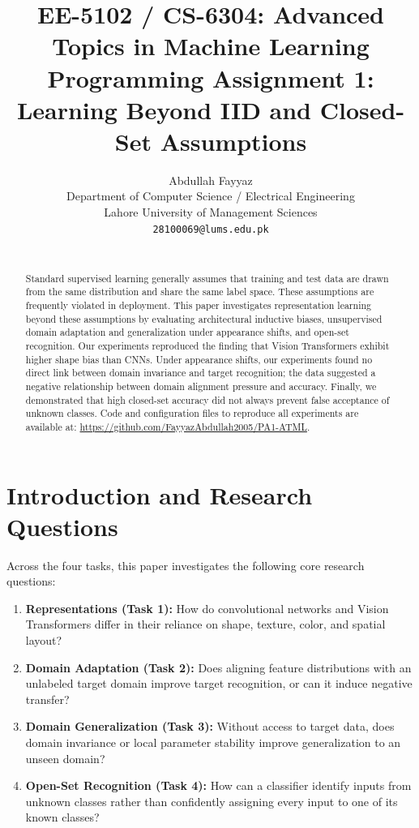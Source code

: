 \documentclass{article}
\title{EE-5102 / CS-6304: Advanced Topics in Machine Learning\\Programming Assignment 1: Learning Beyond IID and Closed-Set Assumptions}
\author{%
Abdullah Fayyaz \\
Department of Computer Science / Electrical Engineering \\
Lahore University of Management Sciences \\
\texttt{28100069@lums.edu.pk} \\
\vspace{1mm} \\
}
\begin{document}
\maketitle

\begin{abstract}
Standard supervised learning generally assumes that training and test data are drawn from the same distribution and share the same label space. These assumptions are frequently violated in deployment. This paper investigates representation learning beyond these assumptions by evaluating architectural inductive biases, unsupervised domain adaptation and generalization under appearance shifts, and open-set recognition. Our experiments reproduced the finding that Vision Transformers exhibit higher shape bias than CNNs. Under appearance shifts, our experiments found no direct link between domain invariance and target recognition; the data suggested a negative relationship between domain alignment pressure and accuracy. Finally, we demonstrated that high closed-set accuracy did not always prevent false acceptance of unknown classes. Code and configuration files to reproduce all experiments are available at: \url{https://github.com/FayyazAbdullah2005/PA1-ATML}.
\end{abstract}

\section{Introduction and Research Questions}
\label{sec:introduction}

Across the four tasks, this paper investigates the following core research questions:
\begin{enumerate}
    \item \textbf{Representations (Task 1):} How do convolutional networks and Vision Transformers differ in their reliance on shape, texture, color, and spatial layout?
    \item \textbf{Domain Adaptation (Task 2):} Does aligning feature distributions with an unlabeled target domain improve target recognition, or can it induce negative transfer?
    \item \textbf{Domain Generalization (Task 3):} Without access to target data, does domain invariance or local parameter stability improve generalization to an unseen domain?
    \item \textbf{Open-Set Recognition (Task 4):} How can a classifier identify inputs from unknown classes rather than confidently assigning every input to one of its known classes?
\end{enumerate}
\end{document}
